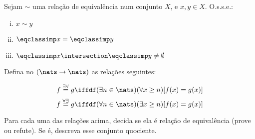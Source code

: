 \begin{exercise}
	Sejam $\sim$ uma relação de equivalência num conjunto $X$, e $x, y \in X$. O.s.s.e.:
	\begin{enumerate}[(i)]
		\item $x \sim y$
		\item $\eqclassimp x = \eqclassimp y$
		\item $\eqclassimp x \intersection \eqclassimp y \neq \emptyset$
	\end{enumerate}
\end{exercise}

\begin{exercise}
Defina no $(\nats \to \nats)$ as relações seguintes:

$$
    f \buildrel{\exists\forall} \over = g \iffdf (\exists n \in \nats) (\forall x \geq n)[f(x) = g(x)]
$$
$$
    f \buildrel{\forall\exists} \over = g \iffdf (\forall n \in \nats) (\exists x \geq n)[f(x) = g(x)]
$$

Para cada uma das relações acima, decida se ela é relação de equivalência (prove ou refute). Se é, descreva esse conjunto quociente.

\end{exercise}
